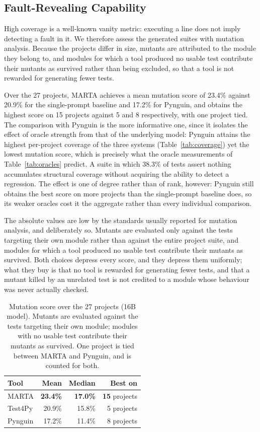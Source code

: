 \subsection{Fault-Revealing Capability}

High coverage is a well-known vanity metric: executing a line does not imply
detecting a fault in it. We therefore assess the generated suites with mutation
analysis. Because the projects differ in size, mutants are attributed to the module
they belong to, and modules for which a tool produced no usable test contribute their
mutants as survived rather than being excluded, so that a tool is not rewarded for
generating fewer tests.

Over the 27 projects, MARTA achieves a mean mutation score of 23.4\% against 20.9\%
for the single-prompt baseline and 17.2\% for Pynguin, and obtains the highest score
on 15 projects against 5 and 8 respectively, with one project tied. The comparison
with Pynguin is the more informative one, since it isolates the effect of oracle
strength from that of the underlying model: Pynguin attains the highest per-project
coverage of the three systems (Table~\ref{tab:coverage}) yet the lowest mutation
score, which is precisely what the oracle measurements of Table~\ref{tab:oracles}
predict. A suite in which 38.3\% of tests assert nothing accumulates structural
coverage without acquiring the ability to detect a regression. The effect is one of
degree rather than of rank, however: Pynguin still obtains the best score on more
projects than the single-prompt baseline does, so its weaker oracles cost it the
aggregate rather than every individual comparison.

The absolute values are low by the standards usually reported for mutation analysis,
and deliberately so. Mutants are evaluated only against the tests targeting their own
module rather than against the entire project suite, and modules for which a tool
produced no usable test contribute their mutants as survived. Both choices depress
every score, and they depress them uniformly; what they buy is that no tool is
rewarded for generating fewer tests, and that a mutant killed by an unrelated test is
not credited to a module whose behaviour was never actually checked.

\begin{table}[htpb]
\centering
\caption{Mutation score over the 27 projects (16B model). Mutants are evaluated
against the tests targeting their own module; modules with no usable test contribute
their mutants as survived. One project is tied between MARTA and Pynguin, and is
counted for both.}
\label{tab:mutation}
\begin{tabular}{lrrr}
\hline
\textbf{Tool} & \textbf{Mean} & \textbf{Median} & \textbf{Best on} \\
\hline
MARTA    & \textbf{23.4\%} & \textbf{17.0\%} & \textbf{15} projects \\
Test4Py  & 20.9\%          & 15.8\%          & 5 projects \\
Pynguin  & 17.2\%          & 11.4\%          & 8 projects \\
\hline
\end{tabular}
\end{table}

